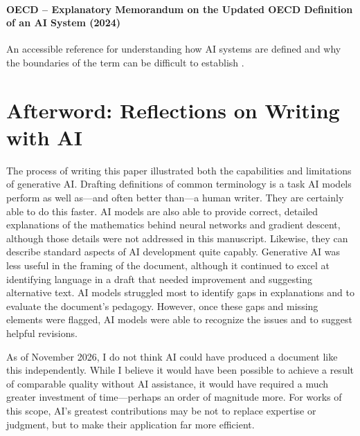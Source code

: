 \documentclass[11pt]{article}
\begin{document}
\paragraph{OECD -- Explanatory Memorandum on the Updated OECD Definition of an AI System (2024)}
  An accessible reference for understanding how AI systems are defined and why the boundaries of the term can be difficult to establish \citep{OECD2024AIDefinition}.

\clearpage  
\section{Afterword: Reflections on Writing with AI}\label{sec:afterword}

The process of writing this paper illustrated both the capabilities and limitations of generative AI.
Drafting definitions of common terminology is a task AI models perform as well as---and often better than---a human writer. They are certainly able to do this faster.
AI models are also able to provide correct, detailed explanations of the mathematics behind neural networks and
gradient descent, although those details were not addressed in this manuscript.  Likewise, they can
describe standard aspects of AI development quite capably.
Generative AI was less useful in the framing of the document, although it continued to excel at
identifying language in a draft that needed improvement and suggesting alternative text.
AI models struggled most to identify gaps in explanations and to evaluate the document's pedagogy.
However, once these gaps and missing elements were flagged, AI models
were able to recognize the issues and to suggest helpful revisions.

As of November 2026, I do not think AI could have produced a document like this independently.
While I believe it would have been possible to achieve a result of comparable quality without AI assistance,
it would have required a much greater investment of time---perhaps an order of magnitude more.
For works of this scope, AI's greatest contributions may be not to replace expertise or judgment,
but to make their application far more efficient.



\end{document}
